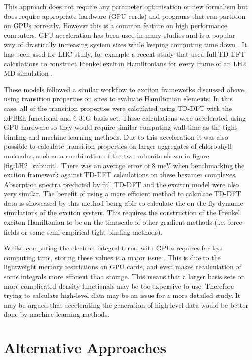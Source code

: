 This approach does not require any parameter optimisation or new formalism but does
require appropriate hardware (GPU cards) and programs that can partition on GPUs
correctly. However this is a common feature on high performance computers. GPU-acceleration
has been used in many studies and is a popular way of drastically increasing system 
sizes while keeping computing time down \cite{Seritan2021}. It has been used for 
LHC study, for example a recent study that used full TD-DFT calculations to construct
Frenkel exciton Hamiltonians for every frame of an LH2 MD simulation \cite{Sisto2014a, Sisto2017}.

These models followed a similar workflow to exciton frameworks discussed above,
using transition properties on sites to evaluate Hamiltonian elements. In this case, 
all of the transition properties were calculated using TD-DFT with the $\omega\text{PBEh}$
functional and 6-31G basis set. These calculations were accelerated using GPU hardware
so they would require similar computing wall-time as the tight-binding and machine-learning
methods. Due to this acceleration it was also possible to calculate transition properties
on larger aggregates of chlorophyll molecules, such as a combination of the two 
subunits shown in figure \ref{fig:LH2_subunit}. There was an average error of 8 meV
when benchmarking the exciton framework against TD-DFT calculations on these hexamer
complexes\cite{Sisto2014a}. Absorption spectra predicted by full TD-DFT and the
exciton model were also very similar. The benefit of using a more efficient method
to calculate TD-DFT data is showcased by this method being able to calculate the
on-the-fly dynamic simulations of the exciton system. This requires the construction
of the Frenkel exciton Hamiltonian to be on the timescale of other gradient methods
(i.e. force-fields or some semi-empirical tight-binding methods).

Whilst computing the electron integral terms with GPUs requires far less computing 
time, storing these values is a major issue \cite{Sisto2014a}. This is due to the
lightweight memory restrictions on GPU cards, and even makes recalculation of some
integrals more efficient than storage. This means that a larger basis sets or more
complicated density functionals may be too expensive to use. Therefore trying to
calculate high-level data may be an issue for a more detailed study. It may be argued
that accelerating the generation of high-level data would be better done by machine-learning
methods.

\section{Alternative Approaches}
\label{sec:possible_novel_methods}

